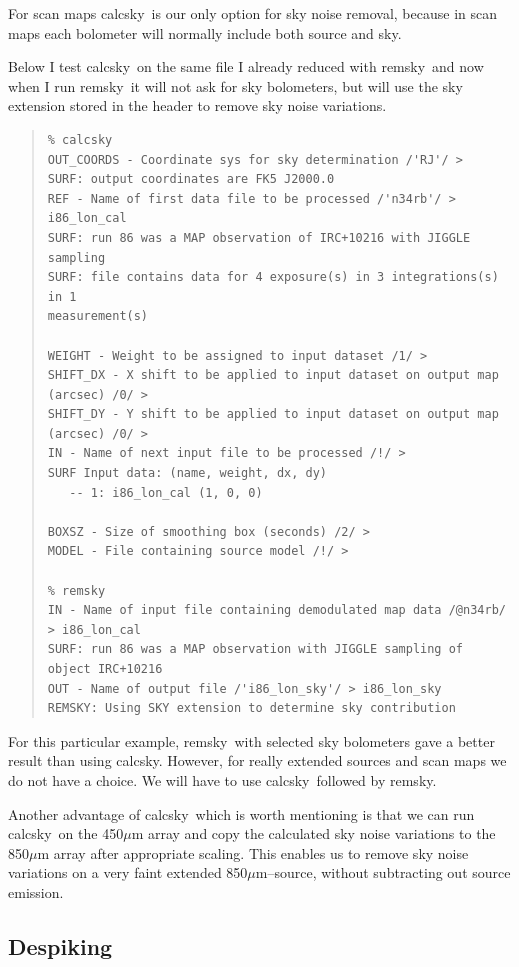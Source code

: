 \documentclass[twoside,11pt]{article}
\newenvironment{myquote}{\begin{quote}\begin{small}}{\end{small}\end{quote}}
\newcommand{\task}[1]{\textsf{#1}}
\newcommand{\calcsky}{\xref{\task{calcsky}}{sun216}{CALCSKY}}
\newcommand{\remsky}{\xref{\task{remsky}}{sun216}{REMSKY}}
\newcommand{\xref}[3]{#1}
\newcommand{\xlabel}[1]{}
\renewcommand{\_}{\texttt{\symbol{95}}}
\begin{document}
For scan maps \calcsky\ is our only option for sky noise removal,
because in scan maps each bolometer will normally include both source
and sky.

Below I test \calcsky\ on the same file I already reduced with
\remsky\, and now when I run \remsky\ it will not ask for sky
bolometers, but will use the sky extension stored in the header to
remove sky noise variations.


\begin{myquote}
\begin{verbatim}
% calcsky
OUT_COORDS - Coordinate sys for sky determination /'RJ'/ > 
SURF: output coordinates are FK5 J2000.0
REF - Name of first data file to be processed /'n34rb'/ > i86_lon_cal
SURF: run 86 was a MAP observation of IRC+10216 with JIGGLE sampling
SURF: file contains data for 4 exposure(s) in 3 integrations(s) in 1
measurement(s)

WEIGHT - Weight to be assigned to input dataset /1/ > 
SHIFT_DX - X shift to be applied to input dataset on output map (arcsec) /0/ > 
SHIFT_DY - Y shift to be applied to input dataset on output map (arcsec) /0/ > 
IN - Name of next input file to be processed /!/ > 
SURF Input data: (name, weight, dx, dy)
   -- 1: i86_lon_cal (1, 0, 0)

BOXSZ - Size of smoothing box (seconds) /2/ > 
MODEL - File containing source model /!/ > 

% remsky
IN - Name of input file containing demodulated map data /@n34rb/ > i86_lon_cal
SURF: run 86 was a MAP observation with JIGGLE sampling of object IRC+10216
OUT - Name of output file /'i86_lon_sky'/ > i86_lon_sky
REMSKY: Using SKY extension to determine sky contribution
\end{verbatim}
\end{myquote}

For this particular example, \remsky\ with selected sky bolometers gave
a better result than using \calcsky. However, for really extended
sources and scan maps we do not have a choice. We will have to use
\calcsky\ followed by \remsky.

Another advantage of \calcsky\ which is worth mentioning is that we can
run \calcsky\ on the 450$\mu$m array and copy the calculated sky noise
variations to the 850$\mu$m array after appropriate scaling. This
enables us to remove sky noise variations on a very faint extended
850$\mu$m--source, without subtracting out source emission.


\subsection{\xlabel{Despiking}Despiking}
\end{document}
